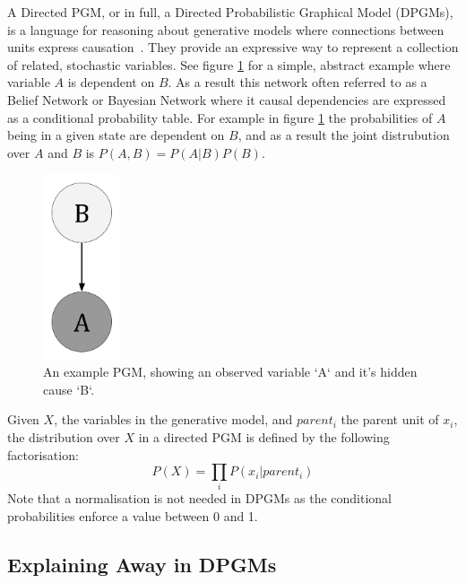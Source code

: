A Directed PGM, or in full, a Directed Probabilistic Graphical Model (DPGMs), is a language for reasoning about generative models where connections between units express causation~\cite{pearl2014probabilistic}. They provide an expressive way to represent a collection of related, stochastic variables. See figure \ref{F:PGM-example} for a simple, abstract example where variable $A$ is dependent on $B$. As a result this network often referred to as a Belief Network or Bayesian Network where it causal dependencies are expressed as a conditional probability table. For example in figure \ref{F:PGM-example} the probabilities of $A$ being in a given state are dependent on $B$, and as a result the joint distrubution over $A$ and $B$ is $P(A,B) = P(A|B)P(B)$.
\begin{figure}
\begin{center}
  \includegraphics[width = 0.2\textwidth]{Assets/PGM_Example_1.png}
\caption{An example PGM, showing an observed variable `A` and it's hidden cause `B`.}
\label{F:PGM-example}
\end{center}
\end{figure}

Given $X$, the variables in the generative model, and $parent_i$ the parent unit of $x_i$, the distribution over $X$ in a directed PGM is defined by the following factorisation:
$$
P(X) = \prod_i P(x_i | parent_i)
$$
Note that a normalisation is not needed in DPGMs as the conditional probabilities enforce a value between 0 and 1.

\subsection{Explaining Away in DPGMs}

